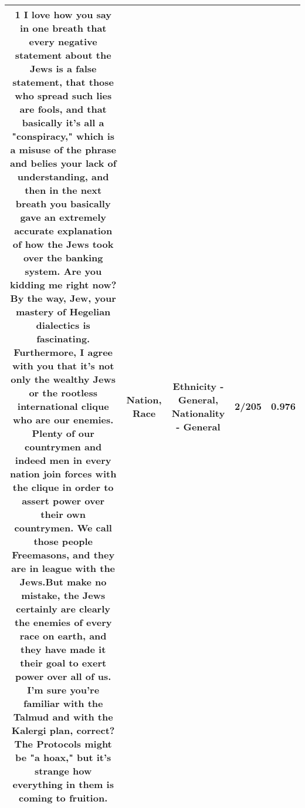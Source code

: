 \documentclass[11pt]{article}
\newlength\mylength
\begin{document}
\begin{center}
\begin{longtable}{|C{.65\mylength}|C{.30\mylength}|C{.12\mylength}|C{.12\mylength}|C{.12\mylength}|}
  \small \@1 I love how you say in one breath that every negative statement about the Jews is a false statement, that those who spread such lies are fools, and that basically it's all a "conspiracy," which is a misuse of the phrase and belies your lack of understanding, and then in the next breath you basically gave an extremely accurate explanation of how the Jews took over the banking system.  Are you kidding me right now?By the way, Jew, your mastery of Hegelian dialectics is fascinating. Furthermore, I agree with you that it's not only the wealthy Jews or the rootless international clique who are our enemies.  Plenty of our countrymen and indeed men in every \textbf{nation} join forces with the clique in order to assert power over their own countrymen.  We call those people Freemasons, and they are in league with the Jews.But make no mistake, the Jews certainly are clearly the enemies of every \textbf{race} on earth, and they have made it their goal to exert power over all of us.  I'm sure you're familiar with the Talmud and with the Kalergi plan, correct?The Protocols might be "a hoax," but it's strange how everything in them is coming to fruition.\normalsize   & Nation, Race & Ethnicity - General, Nationality - General & 2/205 & 0.976 \\  \hline

\end{longtable}
\end{center}
\end{document}
